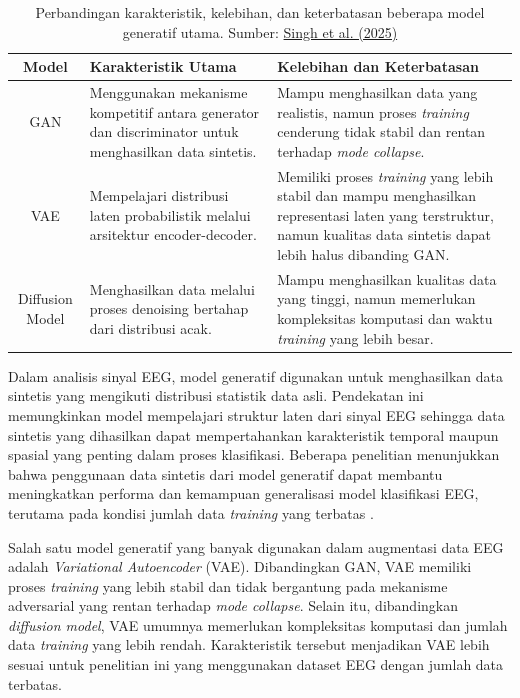     \begin{table}[H]
    \centering
    \footnotesize
\caption{Perbandingan karakteristik, kelebihan, dan keterbatasan beberapa model generatif utama. Sumber: \href{https://www.mdpi.com/2079-9292/15/6/1293}{Singh et al. (2025)}}
    \label{tab:generative_models}
    \begin{tabular}{|c|p{4cm}|p{5cm}|}
    \hline
    \textbf{Model} & \textbf{Karakteristik Utama} & \textbf{Kelebihan dan Keterbatasan} \\ \hline

    GAN &
    Menggunakan mekanisme kompetitif antara generator dan discriminator untuk menghasilkan data sintetis. &
    Mampu menghasilkan data yang realistis, namun proses \textit{training} cenderung tidak stabil dan rentan terhadap \textit{mode collapse}. \\ \hline

    VAE &
    Mempelajari distribusi laten probabilistik melalui arsitektur encoder-decoder. &
    Memiliki proses \textit{training} yang lebih stabil dan mampu menghasilkan representasi laten yang terstruktur, namun kualitas data sintetis dapat lebih halus dibanding GAN. \\ \hline

    Diffusion Model &
    Menghasilkan data melalui proses denoising bertahap dari distribusi acak. &
    Mampu menghasilkan kualitas data yang tinggi, namun memerlukan kompleksitas komputasi dan waktu \textit{training} yang lebih besar. \\ \hline

    \end{tabular}
    \end{table}

Dalam analisis sinyal EEG, model generatif digunakan untuk menghasilkan data sintetis yang mengikuti distribusi statistik data asli. Pendekatan ini memungkinkan model mempelajari struktur laten dari sinyal EEG sehingga data sintetis yang dihasilkan dapat mempertahankan karakteristik temporal maupun spasial yang penting dalam proses klasifikasi. Beberapa penelitian menunjukkan bahwa penggunaan data sintetis dari model generatif dapat membantu meningkatkan performa dan kemampuan generalisasi model klasifikasi EEG, terutama pada kondisi jumlah data \textit{training} yang terbatas \cite{gan_eeg_emotion}.

Salah satu model generatif yang banyak digunakan dalam augmentasi data EEG adalah \textit{Variational Autoencoder} (VAE). Dibandingkan GAN, VAE memiliki proses \textit{training} yang lebih stabil dan tidak bergantung pada mekanisme adversarial yang rentan terhadap \textit{mode collapse}. Selain itu, dibandingkan \textit{diffusion model}, VAE umumnya memerlukan kompleksitas komputasi dan jumlah data \textit{training} yang lebih rendah. Karakteristik tersebut menjadikan VAE lebih sesuai untuk penelitian ini yang menggunakan dataset EEG dengan jumlah data terbatas\cite{eeg_augmentation_review}.   



